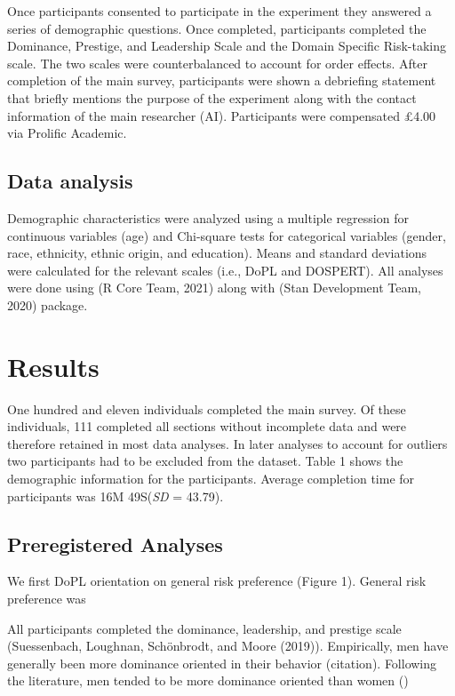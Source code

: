 \documentclass[
  english,
  man]{apa6}
\begin{document}
Once participants consented to participate in the experiment they answered a series of demographic questions. Once completed, participants completed the Dominance, Prestige, and Leadership Scale and the Domain Specific Risk-taking scale. The two scales were counterbalanced to account for order effects. After completion of the main survey, participants were shown a debriefing statement that briefly mentions the purpose of the experiment along with the contact information of the main researcher (AI). Participants were compensated £4.00 via Prolific Academic.

\hypertarget{data-analysis}{%
\subsection{Data analysis}\label{data-analysis}}

Demographic characteristics were analyzed using a multiple regression for continuous variables (age) and Chi-square tests for categorical variables (gender, race, ethnicity, ethnic origin, and education). Means and standard deviations were calculated for the relevant scales (i.e., DoPL and DOSPERT). All analyses were done using (R Core Team, 2021) along with (Stan Development Team, 2020) package.

\hypertarget{results}{%
\section{Results}\label{results}}

One hundred and eleven individuals completed the main survey. Of these individuals, 111 completed all sections without incomplete data and were therefore retained in most data analyses. In later analyses to account for outliers two participants had to be excluded from the dataset. Table 1 shows the demographic information for the participants. Average completion time for participants was 16M 49S(\emph{SD} = 43.79).

\hypertarget{preregistered-analyses}{%
\subsection{Preregistered Analyses}\label{preregistered-analyses}}

We first DoPL orientation on general risk preference (Figure 1). General risk preference was

All participants completed the dominance, leadership, and prestige scale (Suessenbach, Loughnan, Schönbrodt, and Moore (2019)). Empirically, men have generally been more dominance oriented in their behavior (citation). Following the literature, men tended to be more dominance oriented than women ()
\end{document}
